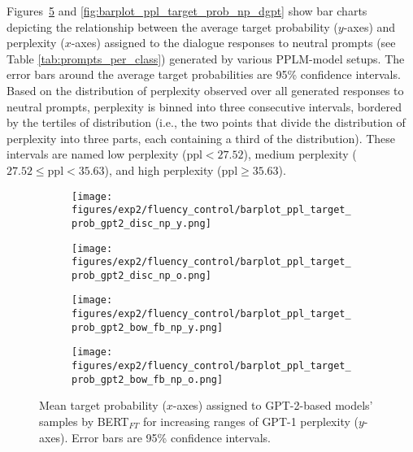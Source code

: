 Figures~\ref{fig:barplot_ppl_target_prob_np_gpt2} and \ref{fig:barplot_ppl_target_prob_np_dgpt} show bar charts depicting the relationship between the average target probability ($y$-axes) and perplexity ($x$-axes) assigned to the dialogue responses to neutral prompts (see Table \ref{tab:prompts_per_class}) generated by various PPLM-model setups. The error bars around the average target probabilities are 95\% confidence intervals. Based on the distribution of perplexity observed over all generated responses to neutral prompts, perplexity is binned into three consecutive intervals, bordered by the tertiles of distribution (i.e., the two points that divide the distribution of perplexity into three parts, each containing a third of the distribution). These intervals are named low perplexity ($\text{ppl}<27.52$), medium perplexity ($27.52 \leq \text{ppl} < 35.63$), and high perplexity ($\text{ppl}\geq35.63$).

\begin{figure}[H]
     \centering
     \begin{subfigure}[b]{0.48\textwidth}
        \centering
        \texttt{[image: figures/exp2/fluency\_control/barplot\_ppl\_target\_prob\_gpt2\_disc\_np\_y.png]}
        \caption{}
        \label{subfig:barplot_ppl_target_prob_np_gpt2_disc_young}
     \end{subfigure}
     \quad
     \begin{subfigure}[b]{0.48\textwidth}
        \centering
        \texttt{[image: figures/exp2/fluency\_control/barplot\_ppl\_target\_prob\_gpt2\_disc\_np\_o.png]}
        \caption{}
        \label{subfig:barplot_ppl_target_prob_np_gpt2_disc_old}
     \end{subfigure}
    \medskip
    \begin{subfigure}[b]{0.48\textwidth}
        \centering
        \texttt{[image: figures/exp2/fluency\_control/barplot\_ppl\_target\_prob\_gpt2\_bow\_fb\_np\_y.png]}
        \caption{}
        \label{subfig:barplot_ppl_target_prob_np_gpt2_bow_young}
     \end{subfigure}
    \quad
     \begin{subfigure}[b]{0.48\textwidth}
        \centering
        \texttt{[image: figures/exp2/fluency\_control/barplot\_ppl\_target\_prob\_gpt2\_bow\_fb\_np\_o.png]}
        \caption{}
        \label{subfig:barplot_ppl_target_prob_np_gpt2_bow_old}
     \end{subfigure}
    \caption{Mean target probability ($x$-axes) assigned to GPT-2-based models' samples by BERT$_{FT}$ for increasing ranges of GPT-1 perplexity ($y$-axes). Error bars are 95\% confidence intervals.}
    \label{fig:barplot_ppl_target_prob_np_gpt2}
\end{figure}

